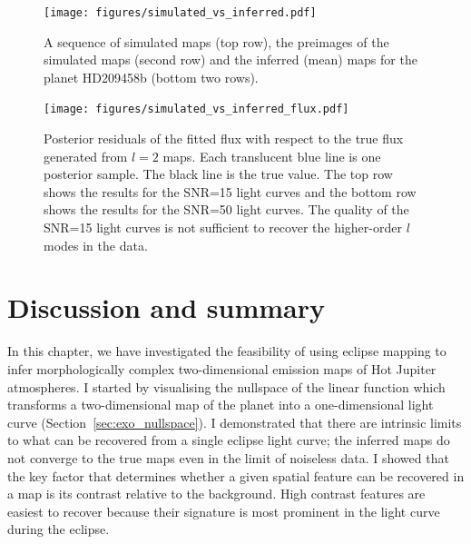 \documentclass[12pt,dvipsnames]{report}
\begin{document}
\begin{figure}[t!]
    \begin{centering}
        \texttt{[image: figures/simulated\_vs\_inferred.pdf]}
        \caption{
           A sequence of simulated maps (top row), the preimages of the simulated maps 
           (second row) and the inferred (mean) maps for the planet HD209458b (bottom two 
           rows).
        }
        \label{fig:simulated_vs_inferred}
    \end{centering}
\end{figure}

\begin{figure}[t!]
    \begin{centering}
        \texttt{[image: figures/simulated\_vs\_inferred\_flux.pdf]}
        \caption{
            Posterior residuals of the fitted flux with respect to the true flux generated
            from $l=2$ maps. Each translucent blue line is one posterior sample. The black 
            line is the true value. The top row shows the results for the SNR=15 light curves
            and the bottom row shows the results for the SNR=50 light curves.
            The quality of the SNR=15 light curves is not sufficient to  recover 
            the higher-order $l$ modes in the data.
        }
        \label{fig:simulated_vs_inferred_fluxes}
    \end{centering}
\end{figure}

\section{Discussion and summary}
\label{sec:discussion}
In this chapter, we have investigated the feasibility of using eclipse mapping to
infer morphologically complex two-dimensional emission maps of Hot Jupiter atmospheres.
I started by visualising the nullspace of the linear function which transforms a two-dimensional map
of the planet into a one-dimensional light curve (Section~\ref{sec:exo_nullspace}). 
I demonstrated 
that there are intrinsic limits to what can be recovered from a single eclipse light curve;
the inferred maps do not converge to the true maps even in the limit of noiseless data.
I showed that the key factor that determines whether a given spatial feature can be 
recovered in a map is its contrast relative to the background. High contrast 
features are easiest to recover because their signature is most prominent in the
light curve during the eclipse.
\end{document}
